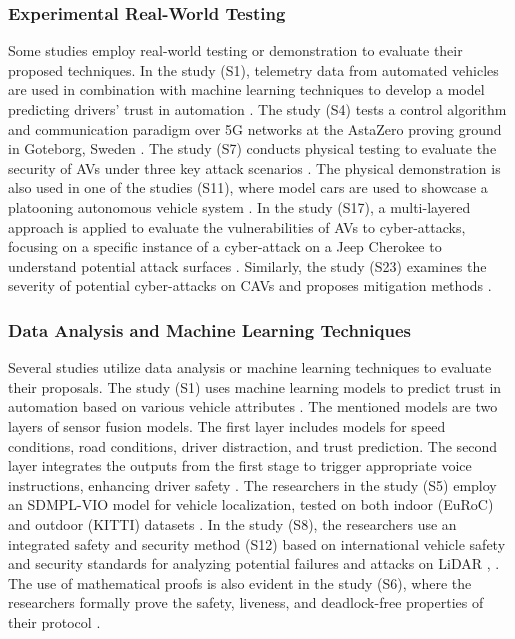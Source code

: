 \documentclass[a4paper,12pt]{article}
\begin{document}
\subsubsection{Experimental Real-World Testing}
\hspace{5mm} Some studies employ real-world testing or demonstration to evaluate their proposed techniques. In the study (S1), telemetry data from automated vehicles are used in combination with machine learning techniques to develop a model predicting drivers’ trust in automation \cite{s1}. The study (S4) tests a control algorithm and communication paradigm over 5G networks at the AstaZero proving ground in Goteborg, Sweden \cite{s4}. The study (S7) conducts physical testing to evaluate the security of AVs under three key attack scenarios \cite{s7}. The physical demonstration is also used in one of the studies (S11), where model cars are used to showcase a platooning autonomous vehicle system \cite{s11}. In the study (S17), a multi-layered approach is applied to evaluate the vulnerabilities of AVs to cyber-attacks, focusing on a specific instance of a cyber-attack on a Jeep Cherokee to understand potential attack surfaces \cite{s17}. Similarly, the study (S23) examines the severity of potential cyber-attacks on CAVs and proposes mitigation methods \cite{s23}.

\subsubsection{Data Analysis and Machine Learning Techniques}
\hspace{5mm} Several studies utilize data analysis or machine learning techniques to evaluate their proposals. The study (S1) uses machine learning models to predict trust in automation based on various vehicle attributes \cite{s1}. The mentioned models are two layers of sensor fusion models. The first layer includes models for speed conditions, road conditions, driver distraction, and trust prediction. The second layer integrates the outputs from the first stage to trigger appropriate voice instructions, enhancing driver safety \cite{s1}. The researchers in the study (S5) employ an SDMPL-VIO model for vehicle localization, tested on both indoor (EuRoC) and outdoor (KITTI) datasets \cite{s5}. In the study (S8), the researchers use an integrated safety and security method (S12) based on international vehicle safety and security standards for analyzing potential failures and attacks on LiDAR \cite{s8}, \cite{s12}. The use of mathematical proofs is also evident in the study (S6), where the researchers formally prove the safety, liveness, and deadlock-free properties of their protocol \cite{s6}.
\end{document}
